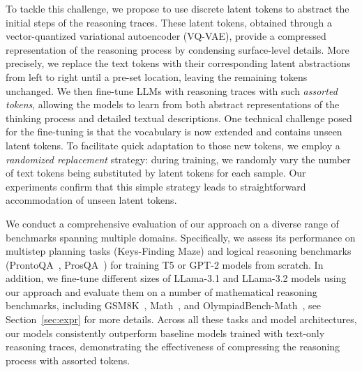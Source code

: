 To tackle this challenge, we propose to use discrete latent tokens to abstract the initial steps of the reasoning traces. These latent tokens, obtained through a vector-quantized variational autoencoder (VQ-VAE), provide a compressed representation of the reasoning process by condensing surface-level details. 
More precisely, we replace the text tokens with their corresponding latent abstractions from left to right until a pre-set location, leaving the remaining tokens unchanged. We then fine-tune LLMs with reasoning traces with such \emph{assorted tokens}, allowing the models to learn from both abstract representations of the thinking process and detailed textual descriptions. 
One technical challenge posed for the fine-tuning is that the vocabulary is now extended and contains unseen latent tokens.
To facilitate quick adaptation to those new tokens, we employ a \emph{randomized replacement} strategy: during training, we randomly vary the number of text tokens being substituted by latent tokens for each sample. Our experiments confirm that this simple strategy leads to straightforward accommodation of unseen latent tokens. %

We conduct a comprehensive evaluation of our approach on a diverse range of benchmarks spanning multiple domains.
Specifically, we assess its performance on multistep planning tasks (Keys-Finding Maze) and logical reasoning benchmarks (ProntoQA~\cite{saparov2022language}, ProsQA~\cite{hao2024training}) for training T5 or GPT-2 models from scratch.
In addition, we fine-tune different sizes of LLama-3.1 and LLama-3.2 models using our approach and evaluate them
on a number of mathematical reasoning benchmarks, including GSM8K~\cite{cobbe2021training}, Math~\cite{hendrycksmath2021}, and OlympiadBench-Math~\cite{he2024olympiadbench}, see Section~\ref{sec:expr} for more details. Across all these tasks and model architectures, our models consistently outperform baseline models trained with text-only reasoning traces, demonstrating the effectiveness of compressing the reasoning process with assorted tokens.